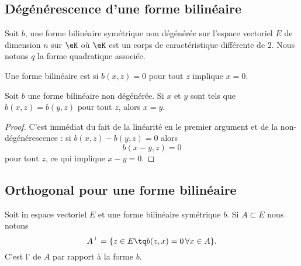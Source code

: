 \subsection{Dégénérescence d'une forme bilinéaire}

Soit \( b\), une forme bilinéaire symétrique non dégénérée  sur l'espace vectoriel \( E\) de dimension \( n\) sur \( \eK\) où \( \eK\) est un corps de caractéristique différente de \( 2\). Nous notons \( q\) la forme quadratique associée.

\begin{definition}      \label{DEFooNUBFooLfCqaK}
	Une forme bilinéaire est  si \( b(x,z)=0\) pour tout \( z\) implique \( x=0\).
\end{definition}

\begin{lemma}   \label{LemyKJpVP}
	Soit \( b\) une forme bilinéaire non dégénérée. Si \( x\) et \( y\) sont tels que \( b(x,z)=b(y,z)\) pour tout \( z\), alors \( x=y\).
\end{lemma}

\begin{proof}
	C'est immédiat du fait de la linéarité en le premier argument et de la non-dégénérescence : si \( b(x,z)-b(y,z)=0\) alors
	\begin{equation}
		b(x-y,z)=0
	\end{equation}
	pour tout \( z\), ce qui implique \( x-y=0\).
\end{proof}

\subsection{Orthogonal pour une forme bilinéaire}

\begin{definition}	\label{DEFooENZGooXMWfUy}
	Soit in espace vectoriel \( E\) et une forme bilinéaire symétrique \( b\). Si \( A\subset E\) nous notons
	\begin{equation}
		A^{\perp}=\{ z\in E\tq b(z,x)=0\,\forall x\in A \}.
	\end{equation}
	C'est l' de \( A\) par rapport à la forme \( b\).
\end{definition}

